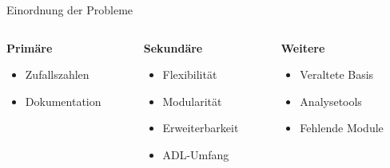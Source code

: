 \begin{frame}{Einordnung der Probleme}
	\begin{columns}[onlytextwidth,t] 
		\begin{column}{0.333 \textwidth}
			\textbf{Primäre}
			\begin{itemize}
				\item Zufallszahlen
				\item Dokumentation
			\end{itemize}
		\end{column}%
		\begin{column}{0.333 \textwidth}
			\textbf{Sekundäre}
			\begin{itemize}
				\item Flexibilität
				\item Modularität
				\item Erweiterbarkeit
				\item ADL-Umfang
			\end{itemize}
		\end{column}
		\begin{column}{0.333 \textwidth}
			\textbf{Weitere}
			\begin{itemize}
				\item Veraltete Basis
				\item Analysetools
				\item Fehlende Module
			\end{itemize}
		\end{column}
	\end{columns}
\end{frame}